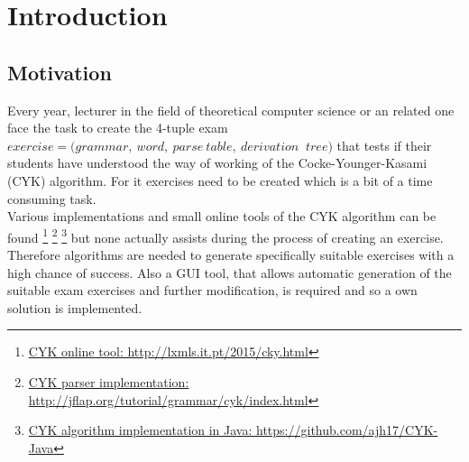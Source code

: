 
\section{Introduction}\label{Introduction}

\subsection{Motivation}
Every year, lecturer in the field of theoretical computer science or an related one face the task to create the 4-tuple exam $exercise = (grammar,\ word,\ parse\ table,\ derivation\ $ $tree)$ that tests if their students have understood the way of working of the Cocke-Younger-Kasami (CYK) algorithm. For it exercises need to be created which is a bit of a time consuming task. \\
Various implementations and small online tools of the CYK algorithm can be found \footnote{\href{http://lxmls.it.pt/2015/cky.html}{CYK online tool: http://lxmls.it.pt/2015/cky.html}} \footnote{\href{http://jflap.org/tutorial/grammar/cyk/index.html}{CYK parser implementation: http://jflap.org/tutorial/grammar/cyk/index.html}} \footnote{\href{https://github.com/ajh17/CYK-Java}{CYK algorithm implementation in Java: https://github.com/ajh17/CYK-Java}} but none actually assists during the process of creating an exercise.\\
Therefore algorithms are needed to generate specifically suitable exercises with a high chance of success. Also a GUI tool, that allows automatic generation of the suitable exam exercises and further modification, is required and so a own solution is implemented.

